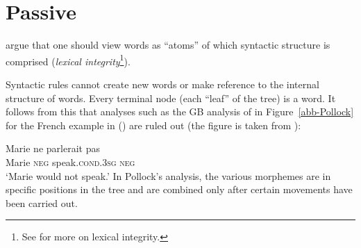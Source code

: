 \section{Passive}
\label{Abschnitt-LFG-Passiv}


\mbox{}\citet{BM95a} argue that one should view words as ``atoms'' of
which syntactic structure is comprised (\emph{lexical integrity}\footnote{
 See 
 for more on lexical integrity.%
}).

Syntactic rules cannot create new words or make reference to the internal structure of words. Every terminal node (each ``leaf'' of the tree) is a word. It follows from this that
analyses such as the GB analysis of \citet{Pollock89a-u} in Figure~\vref{abb-Pollock} for the French example in ()  are ruled out (the figure is taken from
\citealp[]{Kuhn2007a}): 

\ea
\gll Marie ne parlerait pas \\
     Marie \textsc{neg} speak.\textsc{cond.3sg} \textsc{neg}\\
\glt `Marie would not speak.'
\z
%
In Pollock's analysis, the various morphemes are in specific positions in the tree and are combined only after certain movements have been carried out.

